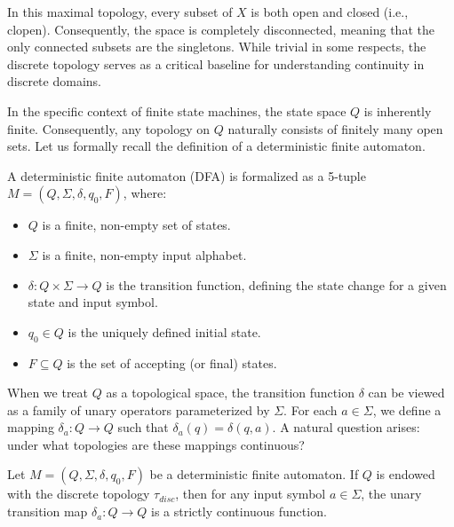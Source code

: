 In this maximal topology, every subset of $X$ is both open and closed (i.e., clopen). Consequently, the space is completely disconnected, meaning that the only connected subsets are the singletons. While trivial in some respects, the discrete topology serves as a critical baseline for understanding continuity in discrete domains.

In the specific context of finite state machines, the state space $Q$ is inherently finite. Consequently, any topology on $Q$ naturally consists of finitely many open sets. Let us formally recall the definition of a deterministic finite automaton.

\begin{definition}
\label{def:dfa}
A deterministic finite automaton (DFA) is formalized as a 5-tuple $M = (Q, \Sigma, \delta, q_0, F)$, where:
\begin{itemize}
    \item $Q$ is a finite, non-empty set of states.
    \item $\Sigma$ is a finite, non-empty input alphabet.
    \item $\delta: Q \times \Sigma \to Q$ is the transition function, defining the state change for a given state and input symbol.
    \item $q_0 \in Q$ is the uniquely defined initial state.
    \item $F \subseteq Q$ is the set of accepting (or final) states.
\end{itemize}
\end{definition}

When we treat $Q$ as a topological space, the transition function $\delta$ can be viewed as a family of unary operators parameterized by $\Sigma$. For each $a \in \Sigma$, we define a mapping $\delta_a: Q \to Q$ such that $\delta_a(q) = \delta(q, a)$. A natural question arises: under what topologies are these mappings continuous?

\begin{lemma}
\label{lem:discrete_continuity}
Let $M = (Q, \Sigma, \delta, q_0, F)$ be a deterministic finite automaton. If $Q$ is endowed with the discrete topology $\tau_{disc}$, then for any input symbol $a \in \Sigma$, the unary transition map $\delta_a: Q \to Q$ is a strictly continuous function.
\end{lemma}

